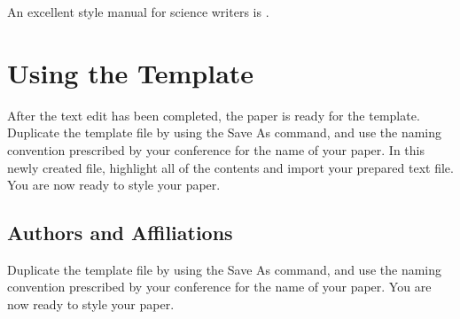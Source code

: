 \documentclass[conference,flushend]{iaria-lite}
\begin{document}
An excellent style manual for science writers is \cite{young2002technical}.

\section{Using the Template}
After the text edit has been completed, the paper is ready for the template. Duplicate the template file by using the Save As command, and use the naming convention prescribed by your conference for the name of your paper. In this newly created file, highlight all of the contents and import your prepared text file. You are now ready to style your paper.

\subsection{Authors and Affiliations}
Duplicate the template file by using the Save As command, and use the naming convention prescribed by your conference for the name of your paper. You are now ready to style your paper.

\end{document}
